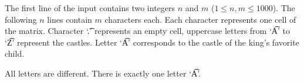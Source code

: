 The first line of the input contains two integers $n$ and $m$ ($1\le n, m\le 1000$). The following $n$ lines contain $m$ characters each. Each character represents one cell of the matrix. Character  `\t{.}' represents an empty cell, uppercase letters from `\t{A}' to `\t{Z}' represent the castles. Letter `\t{A}' corresponds to the castle of the king's favorite child. 

All letters are different. There is exactly one letter `\t{A}'.